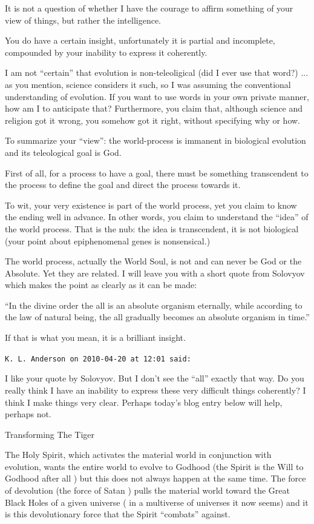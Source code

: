 \begin{footnotesize}
\begin{sffamily}
It is not a question of whether I have the courage to affirm something of your view of things, but rather the intelligence.

You do have a certain insight, unfortunately it is partial and incomplete, compounded by your inability to express it coherently.

I am not ``certain'' that evolution is non-teleoligical (did I ever use that word?) ... as you mention, science considers it such, so I was assuming the conventional understanding of evolution. If you want to use words in your own private manner, how am I to anticipate that? Furthermore, you claim that, although science and religion got it wrong, you somehow got it right, without specifying why or how.

To summarize your ``view'': the world-process is immanent in biological evolution and its teleological goal is God.

First of all, for a process to have a goal, there must be something transcendent to the process to define the goal and direct the process towards it.

To wit, your very existence is part of the world process, yet you claim to know the ending well in advance. In other words, you claim to understand the ``idea'' of the world process. That is the nub: the idea is transcendent, it is not biological (your point about epiphenomenal genes is nonsensical.)

The world process, actually the World Soul, is not and can never be God or the Absolute. Yet they are related. I will leave you with a short quote from Solovyov which makes the point as clearly as it can be made:

``In the divine order the all is an absolute organism eternally, while according to the law of natural being, the all gradually becomes an absolute organism in time.''

If that is what you mean, it is a brilliant insight.

\hfill

\texttt{K. L. Anderson on 2010-04-20 at 12:01 said:}

I like your quote by Solovyov. But I don't see the ``all'' exactly that way. Do you really think I have an inability to express these very difficult things coherently? I think I make things very clear. Perhaps today's blog entry below will help, perhaps not.

Transforming The Tiger

The Holy Spirit, which activates the material world in conjunction with evolution, wants the entire world to evolve to Godhood (the Spirit is the Will to Godhood after all ) but this does not always happen at the same time. The force of devolution (the force of Satan ) pulls the material world toward the Great Black Holes of a given universe ( in a multiverse of universes it now seems) and it is this devolutionary force that the Spirit ``combats'' against.


\end{sffamily}
\end{footnotesize}
